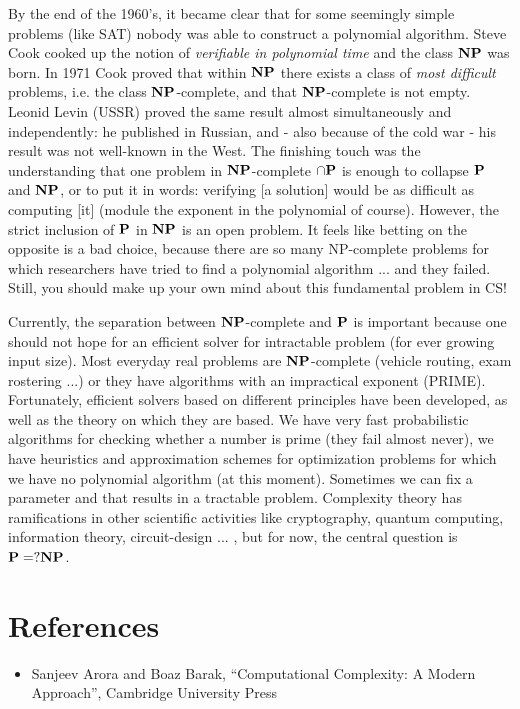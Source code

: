 By the end of the 1960's, it became clear that for some seemingly
simple problems (like SAT) nobody was able to construct a polynomial
algorithm. Steve Cook cooked up the notion of {\em verifiable in
  polynomial time} and the class $\NP$ was born. In 1971 Cook proved
that within $\NP$ there exists a class of {\em most difficult}
problems, i.e. the class $\NP$-complete, and that $\NP$-complete is
not empty. Leonid Levin (USSR) proved the same result almost
simultaneously and independently: he published in Russian, and - also
because of the cold war - his result was not well-known in the West.
The finishing touch was the understanding that one problem in
$\NP$-complete $\cap \P$ is enough to collapse $\P$ and $\NP$, or to
put it in words: verifying [a solution] would be as difficult as
computing [it] (module the exponent in the polynomial of
course). However, the strict inclusion of $\P$ in $\NP$ is an open
problem. It feels like betting on the opposite is a bad choice,
because there are so many NP-complete problems for which researchers
have tried to find a polynomial algorithm ... and they failed. Still,
you should make up your own mind about this fundamental problem in CS!

Currently, the separation between $\NP$-complete and $\P$ is important
because one should not hope for an efficient solver for intractable
problem (for ever growing input size). Most everyday real problems
are $\NP$-complete (vehicle routing, exam rostering ...) or they have
algorithms with an impractical exponent (PRIME). Fortunately,
efficient solvers based on different principles have been developed,
as well as the theory on which they are based. We have very fast
probabilistic algorithms for checking whether a number is prime (they
fail almost never), we have heuristics and approximation schemes for
optimization problems for which we have no polynomial algorithm (at
this moment). Sometimes we can fix a parameter and that results in a
tractable problem. Complexity theory has ramifications in other
scientific activities like cryptography, quantum computing, information
theory, circuit-design ... , but for now, the central question
is $\P =? \NP$.

\section{References}
\begin{itemize}
\item Sanjeev Arora and Boaz Barak, ``Computational Complexity: A Modern Approach'',
Cambridge University Press
\end{itemize}



